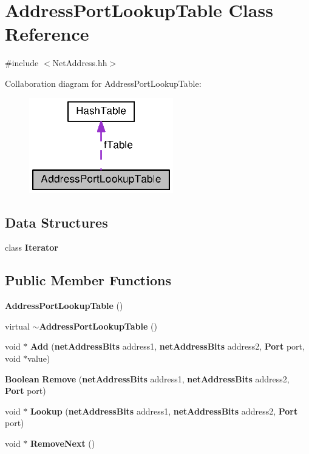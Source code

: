 \section{Address\+Port\+Lookup\+Table Class Reference}
\label{classAddressPortLookupTable}


{\ttfamily \#include $<$Net\+Address.\+hh$>$}



Collaboration diagram for Address\+Port\+Lookup\+Table\+:
\nopagebreak
\begin{figure}[H]
\begin{center}
\leavevmode
\includegraphics[width=178pt]{classAddressPortLookupTable__coll__graph}
\end{center}
\end{figure}
\subsection*{Data Structures}
\begin{DoxyCompactItemize}
\item 
class {\bf Iterator}
\end{DoxyCompactItemize}
\subsection*{Public Member Functions}
\begin{DoxyCompactItemize}
\item 
{\bf Address\+Port\+Lookup\+Table} ()
\item 
virtual {\bf $\sim$\+Address\+Port\+Lookup\+Table} ()
\item 
void $\ast$ {\bf Add} ({\bf net\+Address\+Bits} address1, {\bf net\+Address\+Bits} address2, {\bf Port} port, void $\ast$value)
\item 
{\bf Boolean} {\bf Remove} ({\bf net\+Address\+Bits} address1, {\bf net\+Address\+Bits} address2, {\bf Port} port)
\item 
void $\ast$ {\bf Lookup} ({\bf net\+Address\+Bits} address1, {\bf net\+Address\+Bits} address2, {\bf Port} port)
\item 
void $\ast$ {\bf Remove\+Next} ()
\end{DoxyCompactItemize}
